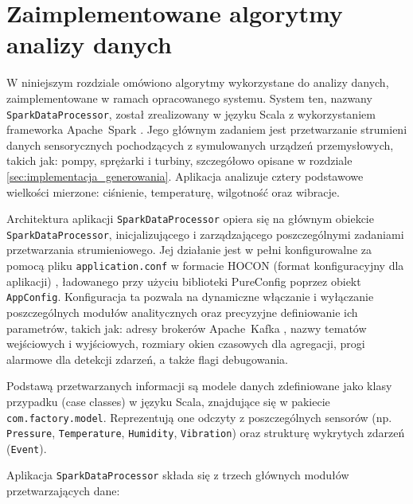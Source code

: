 \section{Zaimplementowane algorytmy analizy danych}
\label{sec:algorytmy_analizy}

W niniejszym rozdziale omówiono algorytmy wykorzystane do analizy danych, zaimplementowane w ramach opracowanego systemu. System ten, nazwany \texttt{SparkDataProcessor}, został zrealizowany w języku Scala z wykorzystaniem frameworka \mbox{Apache Spark} \cite{spark_streaming}. Jego głównym zadaniem jest przetwarzanie strumieni danych sensorycznych pochodzących z symulowanych urządzeń przemysłowych, takich jak: pompy, sprężarki i turbiny, szczegółowo opisane w rozdziale \ref{sec:implementacja_generowania}. Aplikacja analizuje cztery podstawowe wielkości mierzone: ciśnienie, temperaturę, wilgotność oraz wibracje.

Architektura aplikacji \texttt{SparkDataProcessor} opiera się na głównym obiekcie \texttt{SparkDataProcessor}, inicjalizującego i zarządzającego poszczególnymi zadaniami przetwarzania strumieniowego. Jej działanie jest w pełni konfigurowalne za pomocą pliku \texttt{application.conf} w formacie HOCON (format konfiguracyjny dla aplikacji) \cite{hocon_spec}, ładowanego przy użyciu biblioteki PureConfig \cite{pureconfig_docs} poprzez obiekt \texttt{AppConfig}. Konfiguracja ta pozwala na dynamiczne włączanie i wyłączanie poszczególnych modułów analitycznych oraz precyzyjne definiowanie ich parametrów, takich jak: adresy brokerów \mbox{Apache Kafka} \cite{kafka}, nazwy tematów wejściowych i wyjściowych, rozmiary okien czasowych dla agregacji, progi alarmowe dla detekcji zdarzeń, a także flagi debugowania.

Podstawą przetwarzanych informacji są modele danych zdefiniowane jako klasy przypadku (case classes) w języku Scala, znajdujące się w pakiecie \texttt{com.factory.model}. Reprezentują one odczyty z poszczególnych sensorów (np. \texttt{Pressure}, \texttt{Temperature}, \texttt{Humidity}, \texttt{Vibration}) oraz strukturę wykrytych zdarzeń (\texttt{Event}).

Aplikacja \texttt{SparkDataProcessor} składa się z trzech głównych modułów przetwarzających dane:

